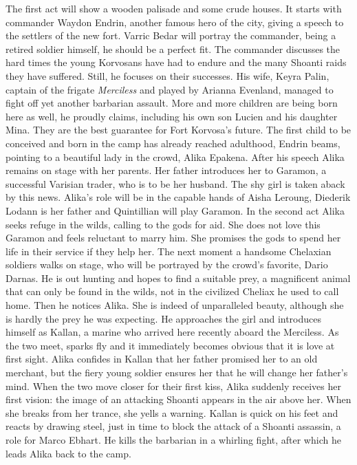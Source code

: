 The first act will show a wooden palisade and some crude houses. It starts with commander Waydon Endrin, another famous hero of the city, giving a speech to the settlers of the new fort. Varric Bedar will portray the commander, being a retired soldier himself, he should be a perfect fit. The commander discusses the hard times the young Korvosans have had to endure and the many Shoanti raids they have suffered. Still, he focuses on their successes. His wife, Keyra Palin, captain of the frigate {\itshape Merciless} and played by Arianna Evenland, managed to fight off yet another barbarian assault. More and more children are being born here as well, he proudly claims, including his own son Lucien and his daughter Mina. They are the best guarantee for Fort Korvosa's future. The first child to be conceived and born in the camp has already reached adulthood, Endrin beams, pointing to a beautiful lady in the crowd, Alika Epakena. After his speech Alika remains on stage with her parents. Her father introduces her to Garamon, a successful Varisian trader, who is to be her husband. The shy girl is taken aback by this news. Alika's role will be in the capable hands of Aisha Leroung, Diederik Lodann is her father and Quintillian will play Garamon. In the second act Alika seeks refuge in the wilds, calling to the gods for aid. She does not love this Garamon and feels reluctant to marry him. She promises the gods to spend her life in their service if they help her. The next moment a handsome Chelaxian soldiers walks on stage, who will be portrayed by the crowd's favorite, Dario Darnas. He is out hunting and hopes to find a suitable prey, a magnificent animal that can only be found in the wilds, not in the civilized Cheliax he used to call home. Then he notices Alika. She is indeed of unparalleled beauty, although she is hardly the prey he was expecting. He approaches the girl and introduces himself as Kallan, a marine who arrived here recently aboard the Merciless. As the two meet, sparks fly and it immediately becomes obvious that it is love at first sight. Alika confides in Kallan that her father promised her to an old merchant, but the fiery young soldier ensures her that he will change her father's mind. When the two move closer for their first kiss, Alika suddenly receives her first vision: the image of an attacking Shoanti appears in the air above her. When she breaks from her trance, she yells a warning. Kallan is quick on his feet and reacts by drawing steel, just in time to block the attack of a Shoanti assassin, a role for Marco Ebhart. He kills the barbarian in a whirling fight, after which he leads Alika back to the camp.\\

